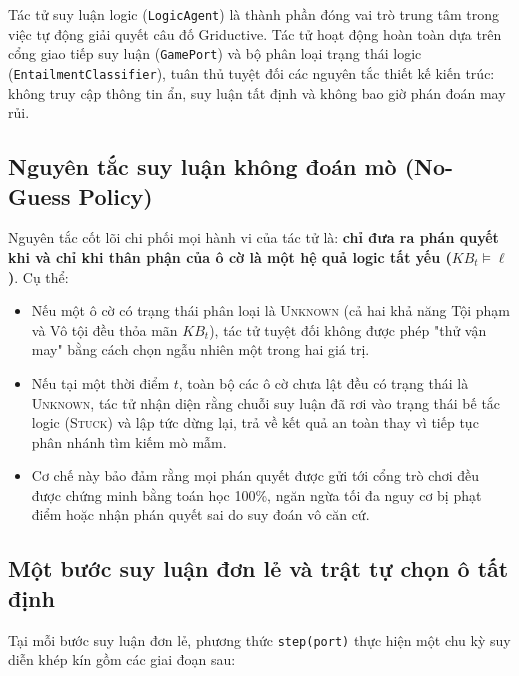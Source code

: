 Tác tử suy luận logic (\texttt{LogicAgent}) là thành phần đóng vai trò trung tâm trong việc tự động giải quyết câu đố Griductive. Tác tử hoạt động hoàn toàn dựa trên cổng giao tiếp suy luận (\texttt{GamePort}) và bộ phân loại trạng thái logic (\texttt{EntailmentClassifier}), tuân thủ tuyệt đối các nguyên tắc thiết kế kiến trúc: không truy cập thông tin ẩn, suy luận tất định và không bao giờ phán đoán may rủi.

\subsection{Nguyên tắc suy luận không đoán mò (No-Guess Policy)}
\label{subsec:no-guess-policy}

Nguyên tắc cốt lõi chi phối mọi hành vi của tác tử là: \textbf{chỉ đưa ra phán quyết khi và chỉ khi thân phận của ô cờ là một hệ quả logic tất yếu ($KB_t \models \ell$)}. Cụ thể:
\begin{itemize}
    \item Nếu một ô cờ có trạng thái phân loại là \textsc{Unknown} (cả hai khả năng Tội phạm và Vô tội đều thỏa mãn $KB_t$), tác tử tuyệt đối không được phép "thử vận may" bằng cách chọn ngẫu nhiên một trong hai giá trị.
    \item Nếu tại một thời điểm $t$, toàn bộ các ô cờ chưa lật đều có trạng thái là \textsc{Unknown}, tác tử nhận diện rằng chuỗi suy luận đã rơi vào trạng thái bế tắc logic (\textsc{Stuck}) và lập tức dừng lại, trả về kết quả an toàn thay vì tiếp tục phân nhánh tìm kiếm mò mẫm.
    \item Cơ chế này bảo đảm rằng mọi phán quyết được gửi tới cổng trò chơi đều được chứng minh bằng toán học 100\%, ngăn ngừa tối đa nguy cơ bị phạt điểm hoặc nhận phán quyết sai do suy đoán vô căn cứ.
\end{itemize}

\subsection{Một bước suy luận đơn lẻ và trật tự chọn ô tất định}
\label{subsec:single-step-deduction}

Tại mỗi bước suy luận đơn lẻ, phương thức \texttt{step(port)} thực hiện một chu kỳ suy diễn khép kín gồm các giai đoạn sau:

